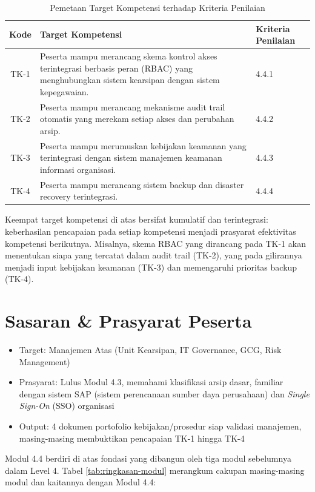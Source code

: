\documentclass[12pt,a4paper]{report}
\begin{document}
\begin{table}[htbp]
\centering
\small
\caption{Pemetaan Target Kompetensi terhadap Kriteria Penilaian}
\begin{tabularx}{\textwidth}{@{} c X l @{}}
\toprule
\textbf{Kode} & \textbf{Target Kompetensi} & \textbf{Kriteria Penilaian} \\
\midrule
TK-1 & Peserta mampu merancang skema kontrol akses terintegrasi berbasis peran (RBAC) yang menghubungkan sistem kearsipan dengan sistem kepegawaian. & 4.4.1 \\
TK-2 & Peserta mampu merancang mekanisme audit trail otomatis yang merekam setiap akses dan perubahan arsip. & 4.4.2 \\
TK-3 & Peserta mampu merumuskan kebijakan keamanan yang terintegrasi dengan sistem manajemen keamanan informasi organisasi. & 4.4.3 \\
TK-4 & Peserta mampu merancang sistem backup dan disaster recovery terintegrasi. & 4.4.4 \\
\bottomrule
\end{tabularx}
\end{table}

Keempat target kompetensi di atas bersifat kumulatif dan terintegrasi: keberhasilan pencapaian pada setiap kompetensi menjadi prasyarat efektivitas kompetensi berikutnya. Misalnya, skema RBAC yang dirancang pada TK-1 akan menentukan siapa yang tercatat dalam audit trail (TK-2), yang pada gilirannya menjadi input kebijakan keamanan (TK-3) dan memengaruhi prioritas backup (TK-4).

\section{Sasaran \& Prasyarat Peserta}
\begin{itemize}[leftmargin=*]
    \item Target: Manajemen Atas (Unit Kearsipan, IT Governance, GCG, Risk Management)
    \item Prasyarat: Lulus Modul 4.3, memahami klasifikasi arsip dasar, familiar dengan sistem SAP (sistem perencanaan sumber daya perusahaan) dan \textit{Single Sign-On} (SSO) organisasi
    \item Output: 4 dokumen portofolio kebijakan/prosedur siap validasi manajemen, masing-masing membuktikan pencapaian TK-1 hingga TK-4
\end{itemize}

\noindent Modul 4.4 berdiri di atas fondasi yang dibangun oleh tiga modul sebelumnya dalam Level 4. Tabel \ref{tab:ringkasan-modul} merangkum cakupan masing-masing modul dan kaitannya dengan Modul 4.4:
\end{document}
